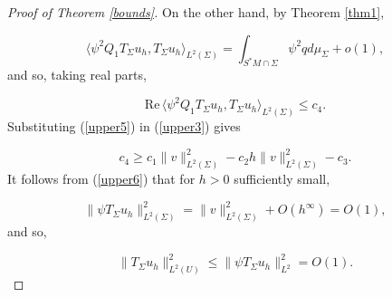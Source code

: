 \documentclass[11pt,reqno]{amsart}
\renewcommand{\Re} {\mathrm{Re\,}}
\theoremstyle{definition}
\begin{document}
\begin{proof}[Proof of Theorem \ref{bounds}]
On the other hand, by Theorem \ref{thm1},

\begin{equation} \label{upper4}
\langle \psi^2 Q_1  T_\Sigma u_h,  T_\Sigma u_h \rangle_{L^2(\Sigma)} = \int_{S^*M \cap \Sigma} \psi^2 q d\mu_{\Sigma} + o(1),
\end{equation} 
and so, taking real parts,

\begin{equation} \label{upper5}
\Re\langle \psi^2   Q_1  T_\Sigma u_h,  T_\Sigma u_h \rangle_{L^2(\Sigma)}  \leq c_4.
\end{equation}
Substituting  (\ref{upper5})  in (\ref{upper3}) gives



\begin{equation} \label{upper6}
c_4 \geq  c_1 \| v \|^2_{L^2(\Sigma)} - c_2 h \| v\|^2_{L^2(\Sigma)}  - c_3.
\end{equation}
It follows from (\ref{upper6}) that for $h>0$ sufficiently small,

\begin{equation} \label{UPPER}
\| \psi T_\Sigma u_h \|^2_{L^2(\Sigma)} = \| v \|^2_{L^2(\Sigma)}+O(h^\infty) = O(1),
\end{equation} 
and so,


$$
\| T_{\Sigma} u_h \|^2_{L^2(U)}  \leq \| \psi T_{\Sigma} u_h \|^2_{L^2}  = O(1).
$$

\end{proof}
\end{document}

